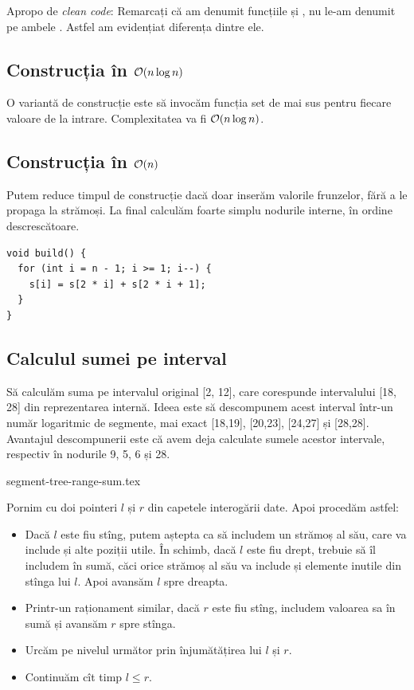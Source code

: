 \documentclass[../main.tex]{subfiles}
\begin{document}
Apropo de \textit{clean code}: Remarcați că am denumit funcțiile  și , nu le-am denumit pe ambele . Astfel am evidențiat diferența dintre ele.

\subsection{Construcția în \texorpdfstring{$\mathcal{O}(n \log n)$}{O(n log n)}}

O variantă de construcție este să invocăm funcția set de mai sus pentru fiecare valoare de la intrare. Complexitatea va fi $\mathcal{O}(n \log n)$.

\subsection{Construcția în \texorpdfstring{$\mathcal{O}(n)$}{O(n)}}

Putem reduce timpul de construcție dacă doar inserăm valorile frunzelor, fără a le propaga la strămoși. La final calculăm foarte simplu nodurile interne, în ordine descrescătoare.

\begin{verbatim}
void build() {
  for (int i = n - 1; i >= 1; i--) {
    s[i] = s[2 * i] + s[2 * i + 1];
  }
}
\end{verbatim}

\subsection{Calculul sumei pe interval}

Să calculăm suma pe intervalul original [2, 12], care corespunde intervalului [18, 28] din reprezentarea internă. Ideea este să descompunem acest interval într-un număr logaritmic de segmente, mai exact [18,19], [20,23], [24,27] și [28,28]. Avantajul descompunerii este că avem deja calculate sumele acestor intervale, respectiv în nodurile 9, 5, 6 și 28.

{segment-tree-range-sum.tex}

Pornim cu doi pointeri $l$ și $r$ din capetele interogării date. Apoi procedăm astfel:

\begin{itemize}
  \item Dacă $l$ este fiu stîng, putem aștepta ca să includem un strămoș al său, care va include și alte poziții utile. În schimb, dacă $l$ este fiu drept, trebuie să îl includem în sumă, căci orice strămoș al său va include și elemente inutile din stînga lui $l$. Apoi avansăm $l$ spre dreapta.

  \item Printr-un raționament similar, dacă $r$ este fiu stîng, includem valoarea sa în sumă și avansăm $r$ spre stînga.

  \item Urcăm pe nivelul următor prin înjumătățirea lui $l$ și $r$.

  \item Continuăm cît timp $l \leq r$.
\end{itemize}
\end{document}
